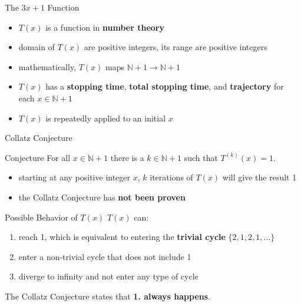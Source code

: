 \documentclass[hyperref={colorlinks,allcolors=black}]{beamer}
\begin{document}
\begin{frame}{The $3x+1$ Function}
\begin{itemize}
    \item $T(x)$ is a function in \textbf{number theory}
    \item domain of $T(x)$ are positive integers, its range are positive 
        integers
    \item mathematically, 
        $T(x)$ maps $\mathbb{N} + 1 \rightarrow \mathbb{N} + 1$ 
    \item $T(x)$ has a \textbf{stopping time}, \textbf{total stopping 
        time}, and \textbf{trajectory} for each $x \in \mathbb{N} + 1$
    \item $T(x)$ is repeatedly applied to an initial $x$
\end{itemize}
\end{frame}


\begin{frame}{Collatz Conjecture}
\begin{block}{Conjecture}
For all $x \in \mathbb{N} + 1$ there is a $k \in \mathbb{N} + 1$ such that
$T^{(k)}(x)=1$.
\end{block}

\begin{itemize}
    \item starting at any positive integer $x$, $k$ iterations of $T(x)$ will 
        give the result 1
    \item the Collatz Conjecture has \textbf{not been proven}
\end{itemize}
\end{frame}


\begin{frame}{Possible Behavior of $T(x)$}
$T(x)$ can:
\begin{enumerate}
    \item reach 1, which is equivalent to entering the \textbf{trivial cycle} 
        $\{2,1,2,1,\dots\}$
    \item enter a non-trivial cycle that does not include 1
    \item diverge to infinity and not enter any type of cycle
\end{enumerate}
    The Collatz Conjecture states that \textbf{1. always happens}.
\end{frame}
\end{document}
